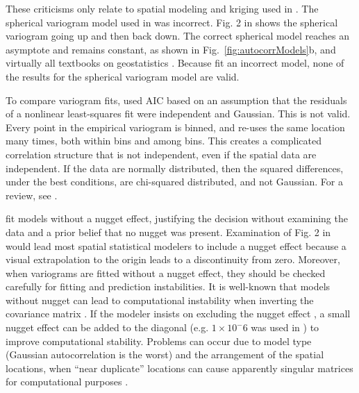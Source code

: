 \documentclass[11pt, titlepage]{article}\usepackage[]{graphicx}\usepackage[]{color}
\begin{document}
\begin{spacing}{1.9}
\begin{flushleft}
These criticisms only relate to spatial modeling and kriging used in \citet{Ladl:Avga:Whea:Boyc:pred:2016}. The spherical variogram model used in \citet{Ladl:Avga:Whea:Boyc:pred:2016} was incorrect.  Fig. 2 in \citet{Ladl:Avga:Whea:Boyc:pred:2016} shows the spherical variogram going up and then back down.  The correct spherical model reaches an asymptote and remains constant, as shown in Fig.~\ref{fig:autocorrModels}b, and virtually all textbooks on geostatistics \citep{Jour:Huij:mini:1978,Isaa:Sriv:appl:1989,Cres:stat:1993,Goov:geos:1997,Chil:Delf:geos:1999,Fort:Dale:spat:2005,Webs:Oliv:geos:2007}. Because \citet{Ladl:Avga:Whea:Boyc:pred:2016} fit an incorrect model, none of the results for the spherical variogram model are valid.
		
To compare variogram fits, \citet{Ladl:Avga:Whea:Boyc:pred:2016} used AIC based on an assumption that the residuals of a nonlinear least-squares fit were independent and Gaussian. This is not valid.  Every point in the empirical variogram is binned, and re-uses the same location many times, both within bins and among bins.  This creates a complicated correlation structure that is not independent, even if the spatial data are independent.  If the data are normally distributed, then the squared differences, under the best conditions, are chi-squared distributed, and not Gaussian.  For a review, see \citet{Cres:stat:1993}.

\citet{Ladl:Avga:Whea:Boyc:pred:2016} fit models without a nugget effect, justifying the decision without examining the data and a prior belief that no nugget was present. Examination of Fig. 2 in \citet{Ladl:Avga:Whea:Boyc:pred:2016} would lead most spatial statistical modelers to include a nugget effect because a visual extrapolation to the origin leads to a discontinuity from zero.  Moreover, when variograms are fitted without a nugget effect, they should be checked carefully for fitting and prediction instabilities. It is well-known that models without nugget can lead to computational instability when inverting the covariance matrix \citep{Diam:Arms:robu:1984,Posa:cond:1989,ODow:cond:1991,Abab:cond:1994}. If the modeler insists on excluding the nugget effect \citep[as often occurs when using kriging to approximate deterministic computer models, e.g.][]{Mart:Simp:krig:2005}, a small nugget effect can be added to the diagonal (e.g. $1 \times 10^-6$ was used in \citet{Book:Denn:Fran:Sera:etal:rigo:1999}) to improve computational stability.  Problems can occur due to model type (Gaussian autocorrelation is the worst) and the arrangement of the spatial locations, when ``near duplicate'' locations can cause apparently singular matrices for computational purposes \citep[][p. 220]{Biva:Pebe:Gome:appl:2008}.


\end{flushleft}
\end{spacing}
\end{document}
